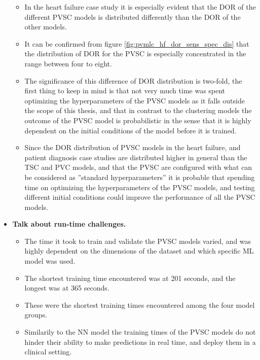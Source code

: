 \begin{itemize}
\begin{itemize}
        \item In the heart failure case study it is especially evident that the DOR of the different PVSC models is distributed differently than the DOR of the other models.
        \item It can be confirmed from figure \ref{fig:pvmlc_hf_dor_sens_spec_dis} that the distribution of DOR for the PVSC is especially concentrated in the range between four to eight.
        \item The significance of this difference of DOR distribution is two-fold, the first thing to keep in mind is that not very much time was spent optimizing the hyperparameters of the PVSC models as it falls outside the scope of this thesis, and that in contrast to the clustering models the outcome of the PVSC model is probabilistic in the sense that it is highly dependent on the initial conditions of the model before it is trained. 
        \item Since the DOR distribution of PVSC models in the heart failure, and patient diagnosis case studies are distributed higher in general than the TSC and PVC models, and that the PVSC are configured with what can be considered as ''standard hyperparameters'' it is probable that spending time on optimizing the hyperparameters of the PVSC models, and testing different initial conditions could improve the performance of all the PVSC models. 
    \end{itemize}
    \item \textbf{Talk about run-time challenges.}
    \begin{itemize}
        \item The time it took to train and validate the PVSC models varied, and was highly dependent on the dimensions of the dataset and which specific ML model was used. 
        \item The shortest training time encountered was at 201 seconds, and the longest was at 365 seconds.
        \item These were the shortest training times encountered among the four model groups.
        \item Similarily to the NN model the training times of the PVSC models do not hinder their ability to make predictions in real time, and deploy them in a clinical setting.
    \end{itemize}
\end{itemize}
